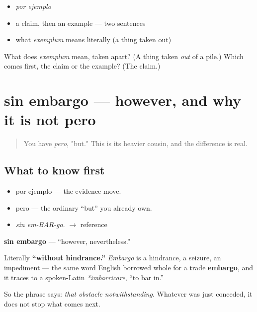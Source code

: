 \begin{itemize}
\raggedright
  \item \emph{por ejemplo}
  \item a claim, then an example — two sentences
  \item what \emph{exemplum} means literally (a thing taken out)
\end{itemize}

\begin{tcolorbox}[breakable,colback=teal!4,colframe=teal!35!black,title={Before you move on}]
What does \emph{exemplum} mean, taken apart? (A thing taken \emph{out} of a pile.) Which comes first, the claim or the example? (The claim.)
\end{tcolorbox}
\section[sin embargo]{sin embargo — however, and why it is not pero}

\label{lesson:ES-C270-sin-embargo}



\begin{quote}
You have \emph{pero}, "but." This is its heavier cousin, and the difference is real.
\end{quote}

\subsection*{What to know first}
\begin{itemize}
\raggedright
  \item por ejemplo — the evidence move.
  \item pero — the ordinary \textquotedblleft{}but\textquotedblright{} you already own.
\end{itemize}

\begin{sounds}
\begin{itemize}
\raggedright
  \item \emph{sin em-BAR-go}. $\to$ reference
\end{itemize}
\end{sounds}

\begin{cousinweb}
\textbf{sin embargo} — \textquotedblleft{}however, nevertheless.\textquotedblright{}

Literally \textbf{\textquotedblleft{}without hindrance.\textquotedblright{}} \emph{Embargo} is a hindrance, a seizure, an impediment — the same word English borrowed whole for a trade \textbf{embargo}, and it traces to a spoken-Latin \emph{*imbarricare}, \textquotedblleft{}to bar in.\textquotedblright{}

So the phrase says: \emph{that obstacle notwithstanding}. Whatever was just conceded, it does not stop what comes next.
\end{cousinweb}

